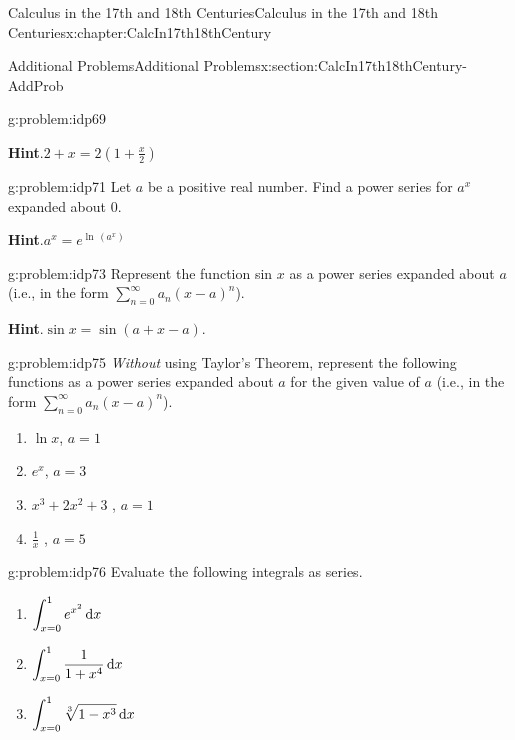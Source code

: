 \begin{chapterptx}{Calculus in the 17th and 18th Centuries}{}{Calculus in the 17th and 18th Centuries}{}{}{x:chapter:CalcIn17th18thCentury}
\begin{sectionptx}{Additional Problems}{}{Additional Problems}{}{}{x:section:CalcIn17th18thCentury-AddProb}
\begin{problem}{}{g:problem:idp69}
\begin{enumerate}[font=\bfseries,label=(\alph*),ref=\alph*]
				\par\smallskip%
				\noindent\textbf{\blocktitlefont Hint}.\hypertarget{g:hint:idp70}{}\quad{}\(2+x=2\left(1+\frac{x}{2}\right)\)%
			\end{enumerate}
		\end{problem}
		\begin{problem}{}{g:problem:idp71}%
			 Let \(a\) be a positive real number. Find a power series for \(a^x\) expanded about 0.%
			\par\smallskip%
			\noindent\textbf{\blocktitlefont Hint}.\hypertarget{g:hint:idp72}{}\quad{}\(a^x=e^{\ln\,\left(a^x\right)}\)%
		\end{problem}
		\begin{problem}{}{g:problem:idp73}%
			 Represent the function \(\)sin \(x\) as a power series expanded about \(a\) (i.e., in the form \(\sum_{n=0}^\infty a_n\left(x-a\right)^n\)).%
			\par\smallskip%
			\noindent\textbf{\blocktitlefont Hint}.\hypertarget{g:hint:idp74}{}\quad{}\(\sin x=\sin \left(a+x-a\right)\).%
		\end{problem}
		\begin{problem}{}{g:problem:idp75}%
			 \emph{Without} using Taylor's Theorem, represent the following functions as a power series expanded about \(a\) for the given value of \(a\) (i.e., in the form \(\sum_{n=0}^\infty a_n\left(x-a\right)^n\)).%
			\begin{enumerate}[font=\bfseries,label=(\alph*),ref=\alph*]
				\item{}\(\ln x\), \(a=1\)%
				\item{}\(e^x\), \(a=3\)%
				\item{}\(x^3+2x^2+3\) , \(a=1\)%
				\item{}\(\frac{1}{x}\) , \(a=5\)%
			\end{enumerate}
		\end{problem}
		\begin{problem}{}{g:problem:idp76}%
			 Evaluate the following integrals as series.%
			\begin{enumerate}[font=\bfseries,label=(\alph*),ref=\alph*]
				\item{}\(\displaystyle\int_{x=0}^1e^{x^2}\,{\rm d} x\)%
				\item{}\(\displaystyle\int_{x=0}^1\frac{1}{1+x^4}\,{\rm d} x\)%
				\item{}\(\displaystyle\int_{x=0}^1\sqrt[3]{1-x^3}\,{\rm d} x\)%
			\end{enumerate}
		\end{problem}
	\end{sectionptx}
\end{chapterptx}
%
%